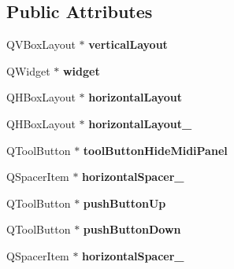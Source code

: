 \subsection*{Public Attributes}
\begin{DoxyCompactItemize}
\item 
\mbox{\label{class_ui___import_midi_panel_a6d7781db236d2b3eff0cd42cee1489f4}} 
Q\+V\+Box\+Layout $\ast$ {\bfseries vertical\+Layout}
\item 
\mbox{\label{class_ui___import_midi_panel_a01d4517d05b7ca88e8937308f5470f57}} 
Q\+Widget $\ast$ {\bfseries widget}
\item 
\mbox{\label{class_ui___import_midi_panel_a2c1fdb6e4d2d808891294cba9109de78}} 
Q\+H\+Box\+Layout $\ast$ {\bfseries horizontal\+Layout}
\item 
\mbox{\label{class_ui___import_midi_panel_a1fe0472ff355cd8a97fc94114d4660e8}} 
Q\+H\+Box\+Layout $\ast$ {\bfseries horizontal\+Layout\+\_}
\item 
\mbox{\label{class_ui___import_midi_panel_a899e806703b5f9dfd9ac6fdbed96ddc9}} 
Q\+Tool\+Button $\ast$ {\bfseries tool\+Button\+Hide\+Midi\+Panel}
\item 
\mbox{\label{class_ui___import_midi_panel_abf4a875f2314cc3c9c37c585023ae0c5}} 
Q\+Spacer\+Item $\ast$ {\bfseries horizontal\+Spacer\+\_}
\item 
\mbox{\label{class_ui___import_midi_panel_a1a72b3ed0964b2095a2ab98162f1d9d7}} 
Q\+Tool\+Button $\ast$ {\bfseries push\+Button\+Up}
\item 
\mbox{\label{class_ui___import_midi_panel_aa140f207548a72369d6ca1bdd19b3981}} 
Q\+Tool\+Button $\ast$ {\bfseries push\+Button\+Down}
\item 
\mbox{\label{class_ui___import_midi_panel_ae3d64a75894b72cca7353ef40893a283}} 
Q\+Spacer\+Item $\ast$ {\bfseries horizontal\+Spacer\+\_}
\item 

\end{DoxyCompactItemize}
